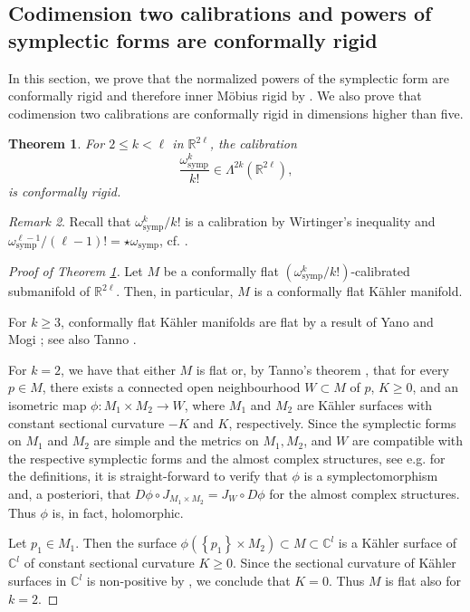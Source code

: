 \documentclass[a4paper,leqno,11pt]{amsart}
\numberwithin{equation}{section}
\newtheorem{theorem}{Theorem}[section]
\theoremstyle{remark}
\newtheorem{remark}[theorem]{Remark}
\theoremstyle{remark}
\newcommand{\R}{\mathbb{R}}
\newcommand{\symp}{\mathrm{symp}}
\begin{document}
\subsection{Codimension two calibrations and powers of symplectic forms are conformally rigid}
\label{sec:conformal-rigidity-products}

In this section, we prove that the normalized powers of the symplectic form are conformally rigid and therefore inner Möbius rigid by . We also prove that codimension two calibrations are conformally rigid in dimensions higher than five.
\begin{theorem}\label{thm:kahler}
For $2\le k < \ell$ in $\mathbb{R}^{2\ell}$, the calibration 
\[
    \frac{ \omega_\symp^{ k } }{ k! } \in \Lambda^{2k}( \R^{2\ell} ),
\]
is conformally rigid.
\end{theorem}

\begin{remark}\label{rem:wirtinger}
Recall that $\omega_\symp^{ k } / k!$ is a calibration by Wirtinger's inequality and $\omega_\symp^{ \ell-1 } / (\ell-1)! = \star\omega_{\symp}$, cf. \cite[1.8.2]{Fed:69}.
\end{remark}

\begin{proof}[Proof of Theorem \ref{thm:kahler}]
Let $M$ be a conformally flat $(\omega_\symp^k/k!)$-calibrated submanifold of $\R^{2\ell}$. Then, in particular, $M$ is a conformally flat K\"ahler manifold. 

For $k \geq 3$, conformally flat Kähler manifolds are flat by a result of Yano and Mogi \cite[Theorem 4.1]{Yan:Mog:55}; see also Tanno \cite[p. 501]{Sh:72}. 

For $k=2$, we have that either $M$ is flat or, by Tanno's theorem \cite[p. 501, Theorem]{Sh:72}, that for every $p \in M$, there exists a connected open neighbourhood $W \subset M$ of $p$, $K \ge 0$, and an isometric map $\phi \colon M_1 \times M_2 \rightarrow W$, where $M_1$ and $M_2$ are Kähler surfaces with constant sectional curvature $-K$ and $K$, respectively. Since the symplectic forms on $M_1$ and $M_2$ are simple and the metrics on $M_1, M_2$, and $W$ are compatible with the respective symplectic forms and the almost complex structures, see e.g. \cite[Section 2.1]{McD:Sal:04} for the definitions, it is straight-forward to verify that $\phi$ is a symplectomorphism and, a posteriori, that $D\phi \circ J_{ M_1 \times M_2 } = J_{ W } \circ D\phi$ for the almost complex structures. Thus $\phi$ is, in fact, holomorphic.

Let $p_1\in M_1$. Then the surface $\phi( \left\{p_1\right\} \times M_2 ) \subset M \subset \mathbb{C}^l$ is a Kähler surface of $\mathbb{C}^l$ of constant sectional curvature $K \geq 0$. Since the sectional curvature of Kähler surfaces in $\mathbb{C}^l$ is non-positive by \cite[Chapter IX, Proposition 9.4]{Kob:Nom:96:II}, we conclude that $K=0$. Thus $M$ is flat also for $k=2$.
\end{proof}
\end{document}
